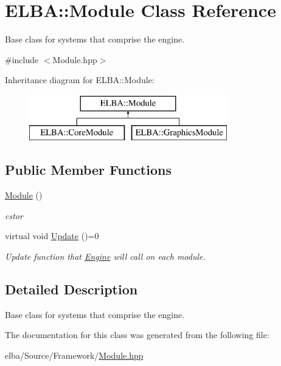 \hypertarget{class_e_l_b_a_1_1_module}{}\section{E\+L\+BA\+:\+:Module Class Reference}
\label{class_e_l_b_a_1_1_module}


Base class for systems that comprise the engine.  




{\ttfamily \#include $<$Module.\+hpp$>$}

Inheritance diagram for E\+L\+BA\+:\+:Module\+:\begin{figure}[H]
\begin{center}
\leavevmode
\includegraphics[height=2.000000cm]{class_e_l_b_a_1_1_module}
\end{center}
\end{figure}
\subsection*{Public Member Functions}
\begin{DoxyCompactItemize}
\item 
\mbox{\label{class_e_l_b_a_1_1_module_af35ca6b0cec41f471adff4145767927c}} 
\mbox{\hyperlink{class_e_l_b_a_1_1_module_af35ca6b0cec41f471adff4145767927c}{Module}} ()
\begin{DoxyCompactList}\small\item\em cstor \end{DoxyCompactList}\item 
\mbox{\label{class_e_l_b_a_1_1_module_a9f7461e29016c9b246c9888fe5534b85}} 
virtual void \mbox{\hyperlink{class_e_l_b_a_1_1_module_a9f7461e29016c9b246c9888fe5534b85}{Update}} ()=0
\begin{DoxyCompactList}\small\item\em Update function that \mbox{\hyperlink{class_e_l_b_a_1_1_engine}{Engine}} will call on each module. \end{DoxyCompactList}\end{DoxyCompactItemize}


\subsection{Detailed Description}
Base class for systems that comprise the engine. 

The documentation for this class was generated from the following file\+:\begin{DoxyCompactItemize}
\item 
elba/\+Source/\+Framework/\mbox{\hyperlink{_module_8hpp}{Module.\+hpp}}\end{DoxyCompactItemize}
